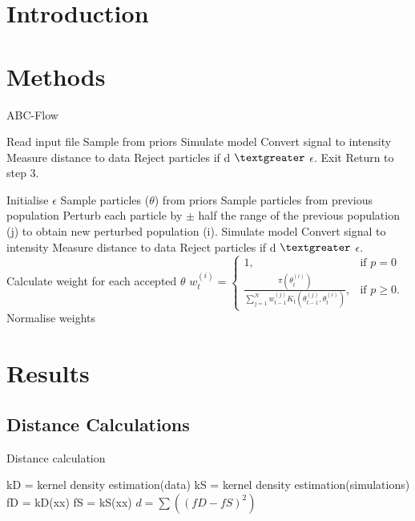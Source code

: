 
\section{Introduction}
\section{Methods}

\begin{algorithm}[htbp]
\label{alg:abc-flow}
\caption{ABC-Flow}
 \begin{algorithmic}[1]
 	\Statex
 \State Read input file
 		\State Sample from priors
 		\State Simulate model
 		\State Convert signal to intensity
 		\State Measure distance to data
		\State Reject particles if d $\textgreater$ $\epsilon$.
 			\State Exit
 		\Else
 			\State Return to step 3.
 		\EndIf
 	\EndIf
 	
 	\Statex
	\State Initialise $\epsilon$ 
		\State Sample particles ($\theta$) from priors
		\Else
			\State Sample particles from previous population
			\State Perturb each particle by $\pm$ half the range of the previous population (j) to obtain new perturbed population (i).
	\EndIf
	\State Simulate model
	\State Convert signal to intensity
	\State Measure distance to data
	\State Reject particles if d $\textgreater$ $\epsilon$.
    \State Calculate weight for each accepted $\theta$
	\State $w_{t}^{(i)} = \begin{cases} 1, & \mbox{if } p = 0 \\\frac{\pi(\theta_{t}^{(i)})}{\sum_{j=1}^N w_{t-1}^{(j)} K_{t}(\theta_{t-1}^{(j)}, \theta_{t}^{(i)})}, & \mbox{if } p \geq  0. \end{cases}$
	\State Normalise weights
	 
	\EndIf
  \end{algorithmic}
\end{algorithm}
\clearpage

\section{Results}

\subsection{Distance Calculations}

\begin{algorithm}[htbp]
\label{alg:dist}
\caption{Distance calculation}
 \begin{algorithmic}[1]
    \Statex
	\State kD = kernel density estimation(data)
	\State kS = kernel density estimation(simulations)
	\State fD = kD(xx)
	\State fS = kS(xx)    
	\State $d = \sum((fD-fS)^2)$
  \end{algorithmic}
\end{algorithm}

